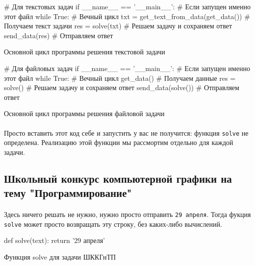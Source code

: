 \documentclass[12pt]{article}
\begin{document}
    \begin{listing}[H]
        \begin{pythoncode}
# Для текстовых задач
if __name__ == '__main__':                        # Если запущен именно этот файл
    while True:                                   # Вечный цикл
        txt = get_text_from_data(get_data())      # Получаем текст задачи
        res = solve(txt)                          # Решаем задачу и сохраняем ответ
        send_data(res)                            # Отправляем ответ
        \end{pythoncode}
        \caption{Основной цикл программы решения текстовой задачи}
        \label{lst:mainloop_text}
    \end{listing}

    \begin{listing}[H]
        \begin{pythoncode}
# Для файловых задач
if __name__ == '__main__':                        # Если запущен именно этот файл
    while True:                                   # Вечный цикл
        get_data()                                # Получаем данные
        res = solve()                             # Решаем задачу и сохраняем ответ
        send_data(solve())                        # Отправляем ответ
        \end{pythoncode}
        \caption{Основной цикл программы решения файловой задачи}
        \label{lst:mainloop_file}
    \end{listing}
    \paragraph{}
    Просто вставить этот код себе и запустить у вас не получится: функция \verb|solve| не определена.
    Реализацию этой функции мы рассмортим отдельно для каждой задачи.

    \newpage

    \subsection{Школьный конкурс компьютерной графики на тему "Программирование"}
    \paragraph{}
    Здесь ничего решать не нужно, нужно просто отправить \verb|29 апреля|.
    Тогда фукция \verb|solve| может просто возвращать эту строку, без каких-либо вычислений.
    \begin{listing}[H]
        \begin{pythoncode}
def solve(text):
    return '29 апреля'
        \end{pythoncode}
        \caption{Функция solve для задачи ШККГнТП}
        \label{lst:solve47}
    \end{listing}
\end{document}
